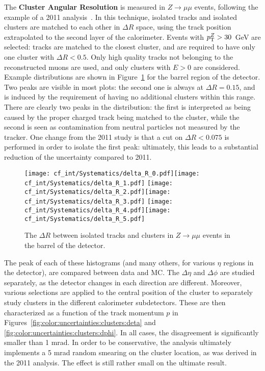 	The \textbf{Cluster Angular Resolution} is measured in $Z\rightarrow \mu\mu$ events, following the example of a 2011 analysis~. In this technique, isolated tracks and isolated clusters are matched to each other in $\Delta R$ space, using the track position extrapolated to the second layer of the calorimeter. Events with $p_{\text{T}}^{Z} > 30$~GeV are selected: tracks are matched to the closest cluster, and are required to have only one cluster with $\Delta R < 0.5$. Only high quality tracks not belonging to the reconstructed muons are used, and only clusters with $E > 0$ are considered. Example distributions are shown in Figure~\ref{fig:color:uncertainties:clusters:deltar} for the barrel region of the detector. Two peaks are visible in most plots: the second one is always at $\Delta R = 0.15$, and is induced by the requirement of having no additional clusters within this range. There are clearly two peaks in the distribution: the first is interpreted as being caused by the proper charged track being matched to the cluster, while the second is seen as contamination from neutral particles not measured by the tracker. One change from the 2011 study is that a cut on $\Delta R< 0.075$ is performed in order to isolate the first peak: ultimately, this leads to a substantial reduction of the uncertainty compared to 2011.


\begin{figure}[h!]
\begin{center}
\texttt{[image: cf\_int/Systematics/delta\_R\_0.pdf]}\texttt{[image: cf\_int/Systematics/delta\_R\_1.pdf]}
\texttt{[image: cf\_int/Systematics/delta\_R\_2.pdf]}\texttt{[image: cf\_int/Systematics/delta\_R\_3.pdf]}
\texttt{[image: cf\_int/Systematics/delta\_R\_4.pdf]}\texttt{[image: cf\_int/Systematics/delta\_R\_5.pdf]}
\end{center}
\caption{The $\Delta R$ between isolated tracks and clusters in $Z\rightarrow\mu\mu$ events in the barrel of the detector.}
\label{fig:color:uncertainties:clusters:deltar}
\end{figure}

	The peak of each of these histograms (and many others, for various $\eta$ regions in the detector), are compared between data and MC. The $\Delta \eta$ and $\Delta \phi$ are studied separately, as the detector changes in each direction are different. Moreover, various selections are applied to the central position of the cluster to separately study clusters in the different calorimeter subdetectors. These are then characterized as a function of the track momentum $p$ in Figures~\ref{fig:color:uncertainties:clusters:deta} and \ref{fig:color:uncertainties:clusters:dphi}. In all cases, the disagreement is significantly smaller than 1 mrad. In order to be conservative, the analysis ultimately implements a 5 mrad random smearing on the cluster location, as was derived in the 2011 analysis. The effect is still rather small on the ultimate result.

